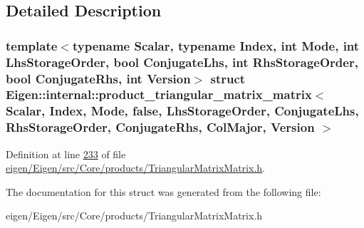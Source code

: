 \subsection{Detailed Description}
\subsubsection*{template$<$typename Scalar, typename Index, int Mode, int Lhs\+Storage\+Order, bool Conjugate\+Lhs, int Rhs\+Storage\+Order, bool Conjugate\+Rhs, int Version$>$\newline
struct Eigen\+::internal\+::product\+\_\+triangular\+\_\+matrix\+\_\+matrix$<$ Scalar, Index, Mode, false, Lhs\+Storage\+Order, Conjugate\+Lhs, Rhs\+Storage\+Order, Conjugate\+Rhs, Col\+Major, Version $>$}



Definition at line \hyperlink{eigen_2_eigen_2src_2_core_2products_2_triangular_matrix_matrix_8h_source_l00233}{233} of file \hyperlink{eigen_2_eigen_2src_2_core_2products_2_triangular_matrix_matrix_8h_source}{eigen/\+Eigen/src/\+Core/products/\+Triangular\+Matrix\+Matrix.\+h}.



The documentation for this struct was generated from the following file\+:\begin{DoxyCompactItemize}
\item 
eigen/\+Eigen/src/\+Core/products/\+Triangular\+Matrix\+Matrix.\+h\end{DoxyCompactItemize}
